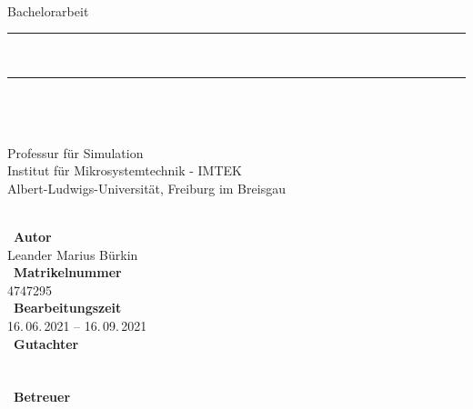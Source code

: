 \begin{titlepage}
\begin{center}
\ \\
\newcommand{\HorizontalLine}{\rule{\linewidth}{0.3mm}}
{\large Bachelorarbeit}\\[-0.5cm]
\HorizontalLine \\[0.4cm]
{ \huge \bfseries \thetitle }
\HorizontalLine \\[0.7cm]

{\huge \theauthor} \\[0.7cm]
\setlength{\fboxrule}{2pt}
\setlength{\fboxsep}{0pt}
\\[1cm]
Professur für Simulation\\[-0.25cm]
Institut für Mikrosystemtechnik - IMTEK\\[-0.25cm]
Albert-Ludwigs-Universität, Freiburg im Breisgau
\end{center}
\end{titlepage}

\thispagestyle{empty}
\ \vfill \ \\
\
\textbf{Autor}                     \smallskip{} \\
Leander Marius Bürkin              \bigskip{} \\
\
\textbf{Matrikelnummer}            \smallskip{} \\
4747295                            \bigskip{} \\
\
\textbf{Bearbeitungszeit}           \smallskip{} \\
16.\,06.\,2021 -- 16.\,09.\,2021    \bigskip{} \\
\
\textbf{Gutachter}                  \smallskip{} \\
\firstexaminer                      \smallskip{} \\
\secondexaminer                     \bigskip{} \\
\
\textbf{Betreuer}                   \smallskip{} \\
\advisers